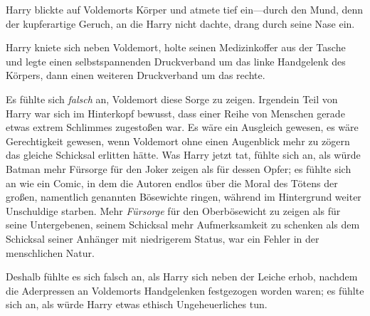 Harry blickte auf Voldemorts Körper und atmete tief ein—durch den Mund, denn der kupferartige Geruch, an die Harry nicht dachte, drang durch seine Nase ein.

Harry kniete sich neben Voldemort, holte seinen Medizinkoffer aus der Tasche und legte einen selbstspannenden Druckverband um das linke Handgelenk des Körpers, dann einen weiteren Druckverband um das rechte.

Es fühlte sich \emph{falsch} an, Voldemort diese Sorge zu zeigen. Irgendein Teil von Harry war sich im Hinterkopf bewusst, dass einer Reihe von Menschen gerade etwas extrem Schlimmes zugestoßen war. Es wäre ein Ausgleich gewesen, es wäre Gerechtigkeit gewesen, wenn Voldemort ohne einen Augenblick mehr zu zögern das gleiche Schicksal erlitten hätte. Was Harry jetzt tat, fühlte sich an, als würde Batman mehr Fürsorge für den Joker zeigen als für dessen Opfer; es fühlte sich an wie ein Comic, in dem die Autoren endlos über die Moral des Tötens der großen, namentlich genannten Bösewichte ringen, während im Hintergrund weiter Unschuldige starben. Mehr \emph{Fürsorge} für den Oberbösewicht zu zeigen als für seine Untergebenen, seinem Schicksal mehr Aufmerksamkeit zu schenken als dem Schicksal seiner Anhänger mit niedrigerem Status, war ein Fehler in der menschlichen Natur.

Deshalb fühlte es sich falsch an, als Harry sich neben der Leiche erhob, nachdem die Aderpressen an Voldemorts Handgelenken festgezogen worden waren; es fühlte sich an, als würde Harry etwas ethisch Ungeheuerliches tun.

